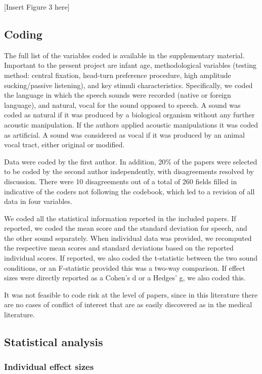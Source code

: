 \documentclass[man]{apa6}
\begin{document}
{[}Insert Figure 3 here{]}

\subsection{Coding}\label{coding}

The full list of the variables coded is available in the supplementary
material. Important to the present project are infant age,
methodological variables (testing method: central fixation, head-turn
preference procedure, high amplitude sucking/passive listening), and key
stimuli characteristics. Specifically, we coded the language in which
the speech sounds were recorded (native or foreign language), and
natural, vocal for the sound opposed to speech. A sound was coded as
natural if it was produced by a biological organism without any further
acoustic manipulation. If the authors applied acoustic manipulations it
was coded as artificial. A sound was considered as vocal if it was
produced by an animal vocal tract, either original or modified.

Data were coded by the first author. In addition, 20\% of the papers
were selected to be coded by the second author independently, with
disagreements resolved by discussion. There were 10 disagreements out of
a total of 260 fields filled in indicative of the coders not following
the codebook, which led to a revision of all data in four variables.

We coded all the statistical information reported in the included
papers. If reported, we coded the mean score and the standard deviation
for speech, and the other sound separately. When individual data was
provided, we recomputed the respective mean scores and standard
deviations based on the reported individual scores. If reported, we also
coded the t-statistic between the two sound conditions, or an
F-statistic provided this was a two-way comparison. If effect sizes were
directly reported as a Cohen's d or a Hedges' g, we also coded this.

It was not feasible to code risk at the level of papers, since in this
literature there are no cases of conflict of interest that are as easily
discovered as in the medical literature.

\subsection{Statistical analysis}\label{statistical-analysis}

\subsubsection{Individual effect sizes}\label{individual-effect-sizes}
\end{document}
